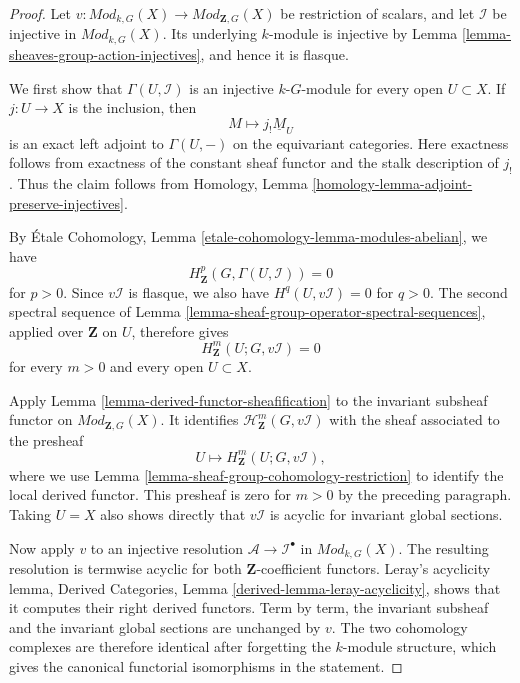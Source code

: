 \begin{proof}
Let $v : \textit{Mod}_{k, G}(X) \to
\textit{Mod}_{\mathbf{Z}, G}(X)$ be restriction of scalars, and let
$\mathcal{I}$ be injective in $\textit{Mod}_{k, G}(X)$. Its underlying
$k$-module is injective by Lemma
\ref{lemma-sheaves-group-action-injectives}, and hence it is flasque.

We first show that $\Gamma(U, \mathcal{I})$ is an injective
$k\text{-}G$-module for every open $U \subset X$. If $j : U \to X$ is the
inclusion, then
$$
M \longmapsto j_!\underline{M}_U
$$
is an exact left adjoint to $\Gamma(U, -)$ on the equivariant categories.
Here exactness follows from exactness of the constant sheaf functor and the
stalk description of $j_!$. Thus the claim follows from Homology, Lemma
\ref{homology-lemma-adjoint-preserve-injectives}.

By \'Etale Cohomology, Lemma
\ref{etale-cohomology-lemma-modules-abelian}, we have
$$
H^p_{\mathbf{Z}}(G, \Gamma(U, \mathcal{I})) = 0
$$
for $p > 0$. Since $v\mathcal{I}$ is flasque, we also have
$H^q(U, v\mathcal{I}) = 0$ for $q > 0$. The second spectral sequence of
Lemma \ref{lemma-sheaf-group-operator-spectral-sequences}, applied over
$\mathbf{Z}$ on $U$, therefore gives
$$
H^m_{\mathbf{Z}}(U; G, v\mathcal{I}) = 0
$$
for every $m > 0$ and every open $U \subset X$.

Apply Lemma \ref{lemma-derived-functor-sheafification} to the invariant
subsheaf functor on $\textit{Mod}_{\mathbf{Z}, G}(X)$. It identifies
$\mathcal{H}^m_{\mathbf{Z}}(G, v\mathcal{I})$ with the sheaf associated to
the presheaf
$$
U \longmapsto H^m_{\mathbf{Z}}(U; G, v\mathcal{I}),
$$
where we use Lemma \ref{lemma-sheaf-group-cohomology-restriction} to
identify the local derived functor. This presheaf is zero for $m > 0$ by
the preceding paragraph. Taking $U = X$ also
shows directly that $v\mathcal{I}$ is acyclic for invariant global sections.

Now apply $v$ to an injective resolution
$\mathcal{A} \to \mathcal{I}^\bullet$ in
$\textit{Mod}_{k, G}(X)$. The resulting resolution is termwise acyclic for
both $\mathbf{Z}$-coefficient functors. Leray's acyclicity lemma, Derived
Categories, Lemma \ref{derived-lemma-leray-acyclicity}, shows that it
computes their right derived functors. Term by term, the invariant subsheaf
and the invariant global sections are unchanged by $v$. The two cohomology
complexes are therefore identical after forgetting the $k$-module
structure, which gives the canonical functorial isomorphisms in the
statement.
\end{proof}



